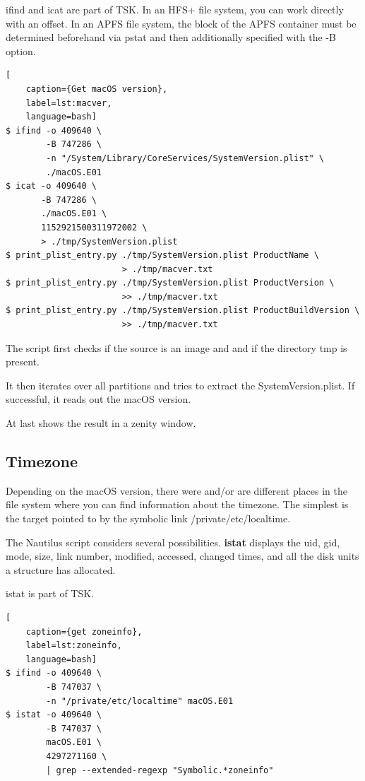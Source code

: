 ifind and icat are part of TSK.\newline
\newline
\noindent In an HFS+ file system, you can work directly with an offset. In an APFS file system, the block of the APFS container must be determined beforehand via pstat and then additionally specified with the \glqq{}-B\grqq{} option.

\begin{lstlisting}[
    caption={Get macOS version},
    label=lst:macver,
    language=bash]
$ ifind -o 409640 \
        -B 747286 \
        -n "/System/Library/CoreServices/SystemVersion.plist" \
        ./macOS.E01
$ icat -o 409640 \
       -B 747286 \
       ./macOS.E01 \
       1152921500311972002 \
       > ./tmp/SystemVersion.plist
$ print_plist_entry.py ./tmp/SystemVersion.plist ProductName \
                       > ./tmp/macver.txt
$ print_plist_entry.py ./tmp/SystemVersion.plist ProductVersion \
                       >> ./tmp/macver.txt
$ print_plist_entry.py ./tmp/SystemVersion.plist ProductBuildVersion \
                       >> ./tmp/macver.txt
\end{lstlisting}

\noindent The script first checks if the source is an image and and if the directory tmp is present.

It then iterates over all partitions and tries to extract the SystemVersion.plist. If successful, it reads out the macOS version.

At last shows the result in a zenity window.

\subsection{Timezone}

Depending on the macOS version, there were and/or are different places in the file system where you can find information about the timezone. The simplest is the target pointed to by the symbolic link /private/etc/localtime.

The Nautilus script considers several possibilities.\newline
\newline
\noindent \textbf{istat} displays the uid, gid, mode, size, link number, modified, accessed, changed times, and all the disk units a structure has allocated.

istat is part of TSK.

\begin{lstlisting}[
    caption={get zoneinfo},
    label=lst:zoneinfo,
    language=bash]
$ ifind -o 409640 \
        -B 747037 \
        -n "/private/etc/localtime" macOS.E01
$ istat -o 409640 \
        -B 747037 \
        macOS.E01 \
        4297271160 \
        | grep --extended-regexp "Symbolic.*zoneinfo"
\end{lstlisting}

